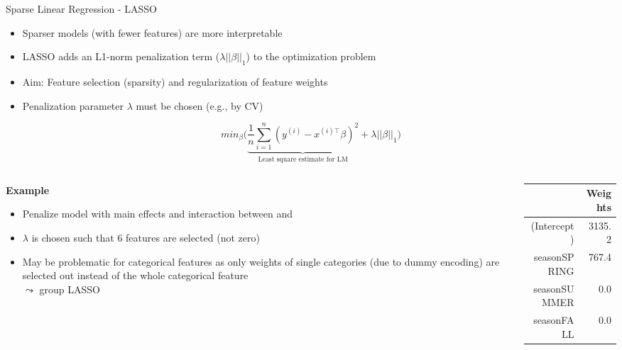 \documentclass[11pt,compress,t,notes=noshow, aspectratio=169, xcolor=table]{beamer}
\begin{document}
\begin{frame}{Sparse Linear Regression - LASSO }
\begin{itemize}
    \item Sparser models (with fewer features) are more interpretable
    \item LASSO adds an L1-norm penalization term  ($\lambda||\beta||_1$) to the optimization problem
    \item Aim: Feature selection (sparsity) and regularization of feature weights
    \item Penalization parameter $\lambda$ must be chosen (e.g., by CV) %
\end{itemize}
$$
min_{\beta} \bigg(\underbrace{\frac{1}{n} \sum_{i=1}^{n} (y^{(i)} - x^{(i)\top}\beta)^2}_\text{Least square estimate for LM} + \lambda||\beta||_1\bigg)
$$
\pause
\begin{columns}[T, totalwidth=\linewidth]
\begin{column}{0.65\textwidth}
\textbf{Example}
\begin{itemize}
    \item Penalize model with main effects and interaction between  and 
    \item $\lambda$ is chosen such that 6 features are selected (not zero)
    \item May be problematic for categorical features as only weights of single categories (due to dummy encoding) are selected out instead of the whole categorical feature\\ %
    $\leadsto$ group LASSO 
\end{itemize}
\end{column}
\begin{column}{0.35\textwidth}
\tiny
\begin{table}[ht]
\centering
\begin{tabular}{rr}
  \hline
 & Weights \\ 
  \hline
(Intercept) & 3135.2 \\ 
  seasonSPRING & 767.4 \\ 
  seasonSUMMER & 0.0 \\ 
  seasonFALL & 0.0 \\ 

\end{tabular}
\end{table}
\end{column}
\end{columns}
\end{frame}
\end{document}
